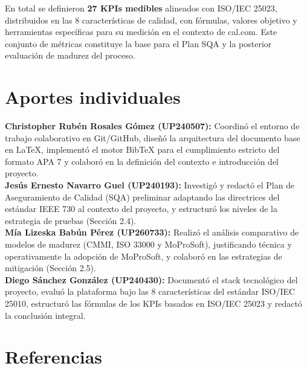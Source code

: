\documentclass[12pt, a4paper]{article}
\begin{document}
En total se definieron \textbf{27 KPIs medibles} alineados con ISO/IEC 25023,
distribuidos en las 8 características de calidad, con fórmulas, valores objetivo y
herramientas específicas para su medición en el contexto de cal.com. Este conjunto de
métricas constituye la base para el Plan SQA y la posterior evaluación de madurez del
proceso.

\section{Aportes individuales}

\textbf{Christopher Rubén Rosales Gómez (UP240507):} Coordinó el entorno de trabajo colaborativo en Git/GitHub, diseñó la arquitectura del documento base en LaTeX, implementó el motor BibTeX para el cumplimiento estricto del formato APA 7 y colaboró en la definición del contexto e introducción del proyecto. \\[0.3cm]

\textbf{Jesús Ernesto Navarro Guel (UP240193):} Investigó y redactó el Plan de Aseguramiento de Calidad (SQA) preliminar adaptando las directrices del estándar IEEE 730 al contexto del proyecto, y estructuró los niveles de la estrategia de pruebas (Sección 2.4). \\[0.3cm]

\textbf{Mía Lizeska Babún Pérez (UP260733):} Realizó el análisis comparativo de modelos de madurez (CMMI, ISO 33000 y MoProSoft), justificando técnica y operativamente la adopción de MoProSoft, y colaboró en las estrategias de mitigación (Sección 2.5). \\[0.3cm]

\textbf{Diego Sánchez González (UP240430):} Documentó el stack tecnológico del proyecto, evaluó la plataforma bajo las 8 características del estándar ISO/IEC 25010, estructuró las fórmulas de los KPIs basados en ISO/IEC 25023 y redactó la conclusión integral.
\newpage
\section{Referencias}
\printbibliography
\end{document}
